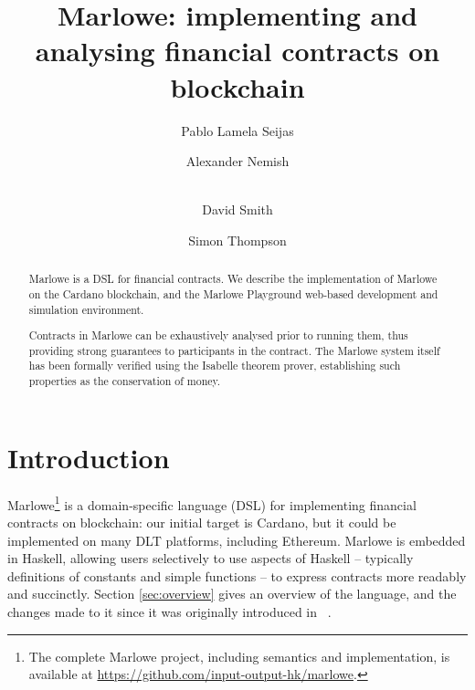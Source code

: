 \documentclass[runningheads]{llncs}
\begin{document}
%
\title{Marlowe: implementing and analysing financial contracts on blockchain}%
%
%
\author{
Pablo {Lamela Seijas} \and
Alexander Nemish \and \\
David Smith \and
Simon Thompson}%
%

%
%
\maketitle              %
%



\begin{abstract}
Marlowe is a DSL for financial contracts. We describe the implementation of Marlowe on the Cardano blockchain, and the Marlowe Playground web-based development and simulation environment.

Contracts in Marlowe can be exhaustively analysed prior to running them, thus providing strong guarantees to participants in the contract. The Marlowe system itself has been formally verified using the Isabelle theorem prover, establishing such properties as the conservation of money.

\end{abstract}


\section{Introduction}

Marlowe\footnote{The complete Marlowe project, including semantics and implementation, is available at \url{https://github.com/input-output-hk/marlowe}.} is a domain-specific language (DSL) for implementing financial contracts on blockchain: our initial target is Cardano, but it could be implemented on many DLT platforms, including Ethereum. Marlowe is embedded in Haskell, allowing users selectively to use aspects of Haskell -- typically definitions of constants and simple functions -- to express contracts more readably and succinctly. Section \ref{sec:overview} gives an overview of the language, and the changes made to it since it was originally introduced in ~\cite{isola-marlowe}.
\end{document}
